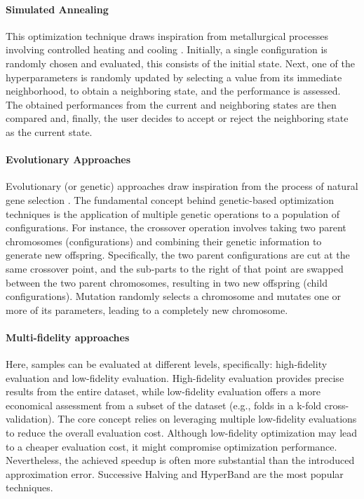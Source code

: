 \paragraph{Simulated Annealing}
This optimization technique draws inspiration from metallurgical processes involving controlled heating and cooling \cite{kirkpatrick1983optimization}.
Initially, a single configuration is randomly chosen and evaluated, this consists of the initial state.
Next, one of the hyperparameters is randomly updated by selecting a value from its immediate neighborhood, to obtain a neighboring state, and the performance is assessed.
The obtained performances from the current and neighboring states are then compared and, finally, the user decides to accept or reject the neighboring state as the current state.

\paragraph{Evolutionary Approaches}
Evolutionary (or genetic) approaches draw inspiration from the process of natural gene selection \cite{holland1992adaptation}.
The fundamental concept behind genetic-based optimization techniques is the application of multiple genetic operations to a population of configurations.
For instance, the crossover operation involves taking two parent chromosomes (configurations) and combining their genetic information to generate new offspring.
Specifically, the two parent configurations are cut at the same crossover point, and the sub-parts to the right of that point are swapped between the two parent chromosomes, resulting in two new offspring (child configurations).
Mutation randomly selects a chromosome and mutates one or more of its parameters, leading to a completely new chromosome.

\paragraph{Multi-fidelity approaches}
Here, samples can be evaluated at different levels, specifically: high-fidelity evaluation and low-fidelity evaluation.
High-fidelity evaluation provides precise results from the entire dataset, while low-fidelity evaluation offers a more economical assessment from a subset of the dataset (e.g., folds in a k-fold cross-validation).
The core concept relies on leveraging multiple low-fidelity evaluations to reduce the overall evaluation cost.
Although low-fidelity optimization may lead to a cheaper evaluation cost, it might compromise optimization performance.
Nevertheless, the achieved speedup is often more substantial than the introduced approximation error.
Successive Halving \cite{pietruszka2021successive} and HyperBand \cite{li2018hyperband} are the most popular techniques.

